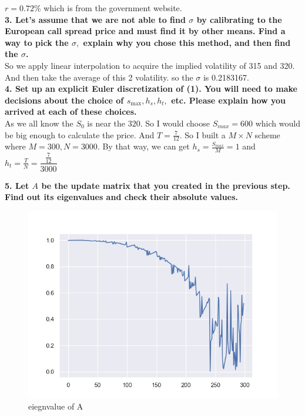 \documentclass{winnower}
\begin{document}
$r=0.72\%$ which is from the government website.
\\



\textbf{3. Let's assume that we are not able to find $\sigma$ by calibrating to the European call spread price and must find it by other means. Find a way to pick the $\sigma,$ explain why you chose this method, and then find the $\sigma$.}
\\

So we apply linear interpolation to acquire the implied volatility of 315 and 320. And then take the average of this 2 volatility. so the $\sigma$ is 0.2183167.
\\

\textbf{4. Set up an explicit Euler discretization of (1). You will need to make decisions about the choice of $s_{\max }, h_{s}, h_{t},$ etc. Please explain how you arrived at each of these choices.}
\\

As we all know the $S_0$ is near the $320$. So I would choose $S_{max}=600$ which would be big enough to calculate the price. And $T=\frac{7}{12}$. So I built a $M\times N$ scheme where $M=300,N=3000$. By that way, we can get $h_s=\frac{S_{max}}{M}=1$ and $h_t=\frac{T}{N}=\dfrac{\frac{7}{12}}{3000}$


\newpage
\textbf{5. Let $A$ be the update matrix that you created in the previous step. Find out its eigenvalues and check their absolute values.}
\\


\begin{figure}[!h]
\begin{center}
\includegraphics[scale=0.7]{1_1.jpg}
\caption
{eiegnvalue of A}
\label{fig:f1}
\end{center}
\end{figure}
\end{document}
